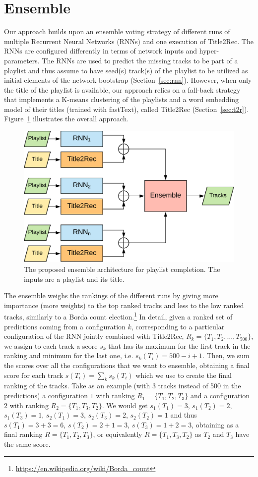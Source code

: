 \section{Ensemble}
\label{sec:ensemble}
Our approach builds upon an ensemble voting strategy of different runs of multiple Recurrent Neural Networks (RNNs) and one execution of Title2Rec. The RNNs are configured differently in terms of network inputs and hyper-parameters. The RNNs are used to predict the missing tracks to be part of a playlist and thus assume to have seed(s) track(s) of the playlist to be utilized as initial elements of the network bootstrap (Section~\ref{sec:rnn}). However, when only the title of the playlist is available, our approach relies on a fall-back strategy that implements a K-means clustering of the playlists and a word embedding model of their titles (trained with fastText), called Title2Rec (Section~\ref{sec:t2r}). Figure~\ref{fig:ensemble} illustrates the overall approach.

\begin{figure}
    \centering
    \includegraphics[width=\textwidth, width=0.47\textwidth]{figures/ensemble.pdf}
    \caption{The proposed ensemble architecture for playlist completion. The inputs are a playlist and its title.}
    \label{fig:ensemble}
\end{figure}

The ensemble weighs the rankings of the different runs by giving more importance (more weights) to the top ranked tracks and less to the low ranked tracks, similarly to a Borda count election.\footnote{\url{https://en.wikipedia.org/wiki/Borda_count}} In detail, given a ranked set of predictions coming from a configuration $k$, corresponding to a particular configuration of the RNN jointly combined with Title2Rec, $R_k = \{T_1, T_2, \dots, T_{500}\}$, we assign to each track a score $s_k$ that has its maximum for the first track in the ranking and minimum for the last one, i.e. $s_k(T_i) = 500 - i + 1$. Then, we sum the scores over all the configurations that we want to ensemble, obtaining a final score for each track $s(T_i) = \sum_{k} s_k(T_i)$ which we use to create the final ranking of the tracks. Take as an example (with 3 tracks instead of 500 in the predictions) a configuration $1$ with ranking $R_1 = \{T_1, T_2, T_3\}$ and a configuration $2$ with ranking $R_2 = \{T_1, T_3, T_2\}$. We would get $s_1(T_1) =  3$, $s_1(T_2) = 2$, $s_1(T_3) = 1$, $s_2(T_1)=3$, $s_2(T_3) = 2$, $s_2(T_2)=1$ and thus $s(T_1) = 3+3= 6$, $s(T_2)= 2+1=3$, $s(T_3)=1+2=3$, obtaining as a final ranking $R = \{T_1, T_2, T_3\}$, or equivalently $R = \{T_1, T_3, T_2\}$ as $T_2$ and $T_3$ have the same score.